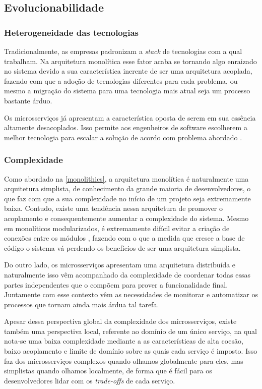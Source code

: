 \subsection{Evolucionabilidade}

\subsubsection{Heterogeneidade das tecnologias}
\label{pers:heterogeneidade}

Tradicionalmente, as empresas padronizam a \textit{stack} de tecnologias com a qual trabalham. Na
arquitetura monolítica esse fator acaba se tornando algo enraizado no sistema devido a sua
característica inerente de ser uma arquitetura acoplada, fazendo com que a adoção de tecnologias
diferentes para cada problema, ou mesmo a migração do sistema para uma tecnologia mais atual seja um
processo bastante árduo.

Os microsserviços já apresentam a característica oposta de serem em sua essência altamente
desacoplados. Isso permite aos engenheiros de software escolherem a melhor tecnologia para escalar a
solução de acordo com problema abordado \cite{Richards2020:FundamentalsOfSoftwareArchitecture}.

\subsubsection{Complexidade}
\label{pers:complexidade}

Como abordado na \autoref{monolithics}, a arquitetura monolítica é naturalmente uma arquitetura
simplista, de conhecimento da grande maioria de desenvolvedores, o que faz com que a sua
complexidade no início de um projeto seja extremamente baixa. Contudo, existe uma tendência nessa
arquitetura de promover o acoplamento e consequentemente aumentar a complexidade do sistema. Mesmo
em monolíticos modularizados, é extremamente difícil evitar a criação de conexões entre os módulos
\cite{StefanTilkov:DontStartWithAMonolith}, fazendo com o que a medida que cresce a base de código
o sistema vá perdendo os benefícios de ser uma arquitetura simplista.

Do outro lado, os microsserviços apresentam uma arquitetura distribuída e naturalmente isso vêm
acompanhado da complexidade de coordenar todas essas partes independentes que o compõem para prover
a funcionalidade final. Juntamente com esse contexto vêm as necessidades de monitorar e automatizar
os processos que tornam ainda mais árdua tal tarefa.

Apesar dessa perspectiva global da complexidade dos microsserviços, existe também uma perspectiva
local, referente ao domínio de um único serviço, na qual nota-se uma baixa complexidade mediante a
as características de alta coesão, baixo acoplamento e limite de domínio sobre as quais cada serviço
é imposto. Isso faz dos microsserviços complexos quando olhamos globalmente para eles, mas
simplistas quando olhamos localmente, de forma que é fácil para os desenvolvedores lidar com os
\textit{trade-offs} de cada serviço.
